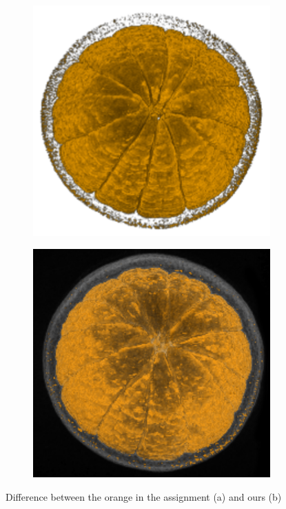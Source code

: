 \begin{figure}[h!]
    \centering
    \captionsetup{justification=centering,margin=0.5cm}
    \begin{subfigure}[t]{0.4\textwidth}
        \includegraphics[width=\textwidth]{img/orange-them.png}
        \caption{ }
    \end{subfigure}
    \begin{subfigure}[t]{0.4\textwidth}
        \includegraphics[width=\textwidth]{img/orange-us.png}
        \caption{ }
    \end{subfigure}
    \caption{Difference between the orange in the assignment (a) and ours (b)}
    \label{fig:compositing}
\end{figure}

